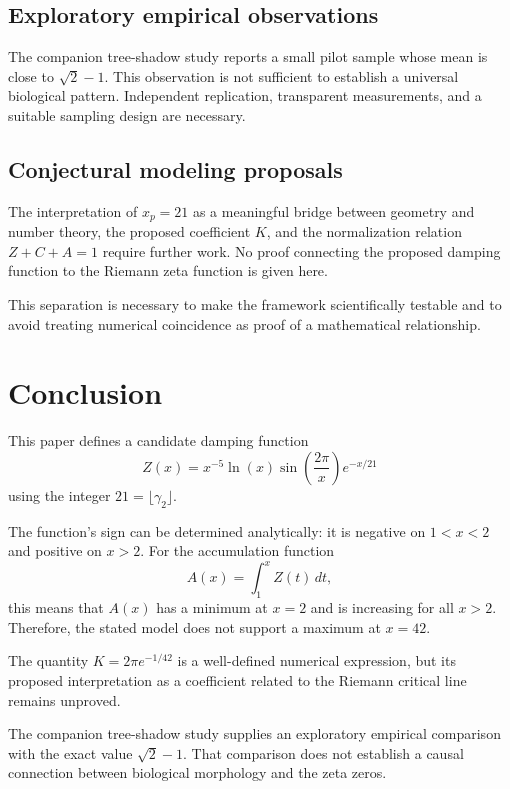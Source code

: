 \documentclass[11pt,a4paper]{article}
\begin{document}
\subsection*{Exploratory empirical observations}

The companion tree-shadow study reports a small pilot sample
whose mean is close to \(\sqrt{2}-1\). This observation is
not sufficient to establish a universal biological pattern.
Independent replication, transparent measurements, and a
suitable sampling design are necessary.

\subsection*{Conjectural modeling proposals}

The interpretation of \(x_p=21\) as a meaningful bridge
between geometry and number theory, the proposed coefficient
\(K\), and the normalization relation \(Z+C+A=1\) require
further work. No proof connecting the proposed damping
function to the Riemann zeta function is given here.

This separation is necessary to make the framework
scientifically testable and to avoid treating numerical
coincidence as proof of a mathematical relationship.

\section{Conclusion}

This paper defines a candidate damping function
\[
Z(x)=x^{-5}\ln(x)\sin\left(\frac{2\pi}{x}\right)e^{-x/21}
\]
using the integer \(21=\lfloor\gamma_2\rfloor\).

The function's sign can be determined analytically:
it is negative on \(1<x<2\) and positive on \(x>2\).
For the accumulation function
\[
A(x)=\int_1^x Z(t)\,dt,
\]
this means that \(A(x)\) has a minimum at \(x=2\) and is
increasing for all \(x>2\). Therefore, the stated model does
not support a maximum at \(x=42\).

The quantity \(K=2\pi e^{-1/42}\) is a well-defined
numerical expression, but its proposed interpretation
as a coefficient related to the Riemann critical line
remains unproved.

The companion tree-shadow study supplies an exploratory
empirical comparison with the exact value \(\sqrt{2}-1\).
That comparison does not establish a causal connection
between biological morphology and the zeta zeros.
\end{document}
